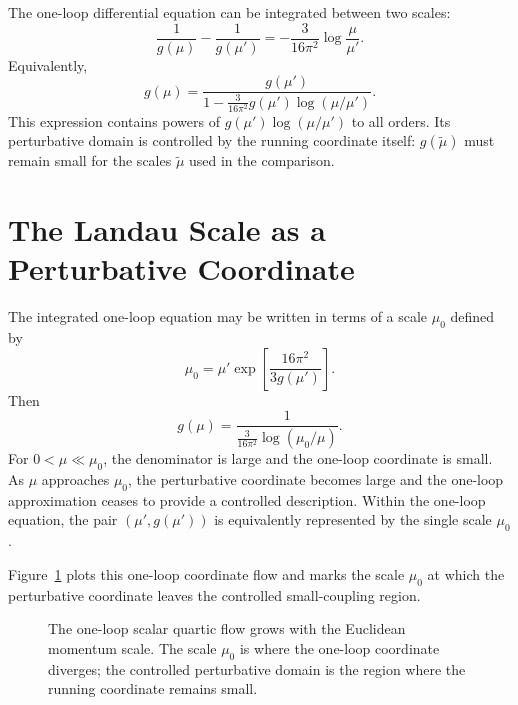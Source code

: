 The one-loop differential equation can be integrated between two scales:
\[
  \frac1{g(\mu)}-\frac1{g(\mu')}
  =
  -\frac{3}{16\pi^2}\log\frac{\mu}{\mu'} .
\]
Equivalently,
\[
  g(\mu)
  =
  \frac{g(\mu')}
       {1-\frac{3}{16\pi^2}g(\mu')\log(\mu/\mu')} .
\]
This expression contains powers of
\(g(\mu')\log(\mu/\mu')\) to all orders.  Its perturbative domain is controlled
by the running coordinate itself: \(g(\widetilde\mu)\) must remain small for
the scales \(\widetilde\mu\) used in the comparison.

\section{The Landau Scale as a Perturbative Coordinate}

The integrated one-loop equation may be written in terms of a scale
\(\mu_0\) defined by
\[
  \mu_0
  =
  \mu'\exp\!\left[
    \frac{16\pi^2}{3g(\mu')}
  \right].
\]
Then
\[
  g(\mu)
  =
  \frac{1}{\frac{3}{16\pi^2}\log(\mu_0/\mu)} .
\]
For \(0<\mu\ll\mu_0\), the denominator is large and the one-loop coordinate is
small.  As \(\mu\) approaches \(\mu_0\), the perturbative coordinate becomes
large and the one-loop approximation ceases to provide a controlled
description.  Within the one-loop equation, the pair
\((\mu',g(\mu'))\) is equivalently represented by the single scale \(\mu_0\).

Figure~\ref{fig:volume-ii-phi-four-landau-scale} plots this one-loop coordinate
flow and marks the scale \(\mu_0\) at which the perturbative coordinate leaves
the controlled small-coupling region.

\begin{figure}[H]
  \centering
  \caption{The one-loop scalar quartic flow grows with the Euclidean momentum
  scale.  The scale \(\mu_0\) is where the one-loop coordinate diverges; the
  controlled perturbative domain is the region where the running coordinate
  remains small.}
  \label{fig:volume-ii-phi-four-landau-scale}
\end{figure}

